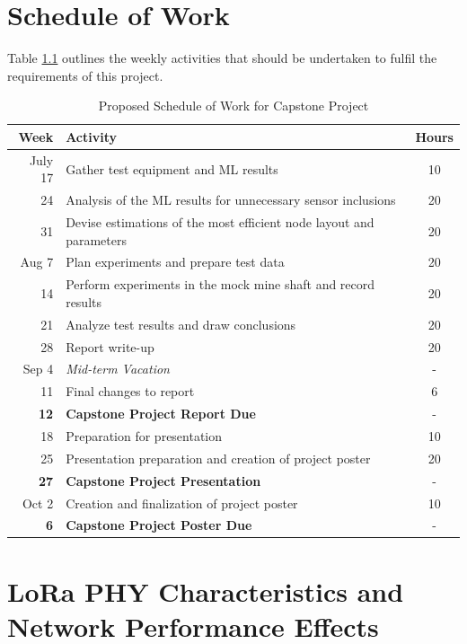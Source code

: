\documentclass[a4paper,twoside,12pt]{report}
\begin{document}
\chapter{Schedule of Work}
Table \ref{tab:workScheduleTable} outlines the weekly activities that should be undertaken to fulfil the requirements of this project.
\begin{table}[!htbp]
	\centering
	\caption{Proposed Schedule of Work for Capstone Project}
	\label{tab:workScheduleTable}
\begin{tabular}{| r | l | c |}
	\hline
	\textbf{Week} & \textbf{Activity} & \textbf{Hours}\\
	\hline\hline 
	July 17 & Gather test equipment and ML results  & 10 \\ 
	24 & Analysis of the ML results for unnecessary sensor inclusions & 20 \\ 
    31 & Devise estimations of the most efficient node layout and parameters & 20 \\ 
    \hline
    Aug 7 & Plan experiments and prepare test data & 20 \\ 
    14 & Perform experiments in the mock mine shaft and record results & 20 \\ 
    21 & Analyze test results and draw conclusions & 20 \\ 
    28 & Report write-up & 20 \\ 
    \hline
    Sep 4 & \textit{Mid-term Vacation} & - \\ 
    11 & Final changes to report & 6 \\ 
    \textbf{12} & \textbf{Capstone Project Report Due} & - \\ 
    18 & Preparation for presentation & 10 \\
    25 & Presentation preparation and creation of project poster & 20 \\
    \textbf{27} & \textbf{Capstone Project Presentation} & - \\ 
	\hline
    Oct 2 & Creation and finalization of project poster & 10 \\
    \textbf{6} & \textbf{Capstone Project Poster Due} & - \\ 
    \hline
\end{tabular} 
\end{table}

\appendix
\chapter{LoRa PHY Characteristics and Network Performance Effects}\label{app:LoraPerf}
\end{document}
